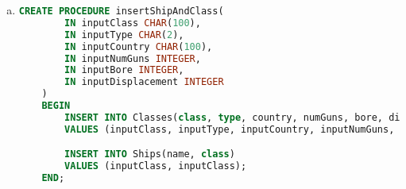 \documentclass[12pt]{article}
\begin{document}
\begin{enumerate}[1.]
\begin{enumerate}[a)]
        \item

    \begin{lstlisting}[language=SQL]
    CREATE PROCEDURE insertShipAndClass(
        IN inputClass CHAR(100),
        IN inputType CHAR(2),
        IN inputCountry CHAR(100),
        IN inputNumGuns INTEGER,
        IN inputBore INTEGER,
        IN inputDisplacement INTEGER
    )
    BEGIN
        INSERT INTO Classes(class, type, country, numGuns, bore, displacement)
        VALUES (inputClass, inputType, inputCountry, inputNumGuns, inputBore, inputDisplacement);

        INSERT INTO Ships(name, class)
        VALUES (inputClass, inputClass);
    END;
    \end{lstlisting}

    \end{enumerate}
\end{enumerate}
\end{document}
